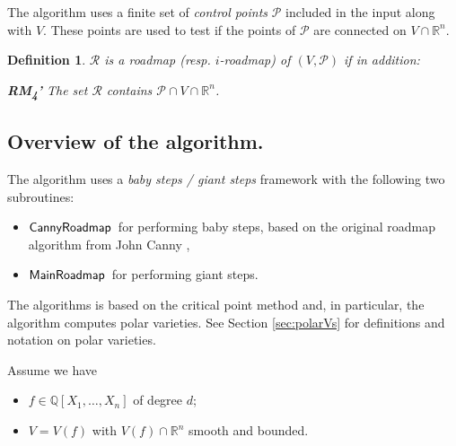\documentclass[12pt]{article}
\newtheorem*{definition}{Definition}
\def\MainRoadmap{{\sf MainRoadmap}}
\def\CannyRoadmap{{\sf CannyRoadmap}}
\begin{document}
\noindent 
The algorithm uses a finite set of \textit{control points} $\mathscr{P}$ included in the input along with $V$. These points are used to test if the points of $\mathscr{P}$ are connected on $V \cap \mathbb{R}^n$. 


\begin{definition}
    \(\mathscr{R}\) is a roadmap (resp. \(i\)-roadmap) of \((V, \mathscr{P})\) if in addition:

\textbf{RM\textsubscript{4}'} The set \(\mathscr{R}\) contains \(\mathscr{P} \cap V \cap \mathbb{R}^n\).
\end{definition}









\subsection{Overview of the algorithm.}
The algorithm uses a \textit{baby steps / giant steps} framework with the following two subroutines:
%
\begin{itemize}
    \item $\CannyRoadmap$~for performing baby steps, based on the original roadmap algorithm from John Canny \cite{canny1988complexity},
    \item $\MainRoadmap$~for performing giant steps. 
\end{itemize}
%
The algorithms is based on the critical point method and, in particular, the algorithm computes polar varieties. See Section \ref{sec:polarVs} for definitions and notation on polar varieties. 
%
\par 
Assume we have 
%
\begin{itemize}
    \item $f\in \mathbb{Q}[X_1,\hdots,X_n]$ of degree $d$;
    \item $V = V(f)$ with $V(f) \cap \mathbb{R}^n$ smooth and bounded.
\end{itemize}
%





\end{document}
